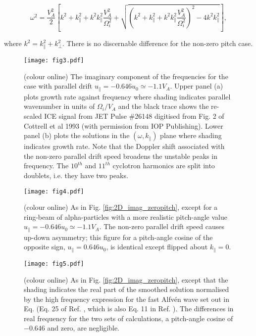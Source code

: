\documentclass[12pt]{iopart}
\begin{document}
\begin{equation}
  \omega^2 = \frac{V_A^2}{2}\left[
    k^2 + k_\parallel^2 + k^2k_\parallel^2 \frac{V_A^2}{\Omega_i^2}
  + \sqrt{
    \left(k^2 + k_\parallel^2 + k^2k_\parallel^2 \frac{V_A^2}{\Omega_i^2}\right)^2
    - 4k^2 k_\parallel^2
}
  \right],
\label{eqn:fastalfven}
\end{equation}

\noindent where $k^2 = k_\parallel^2 + k_\perp^2$. There is no discernable
difference for the non-zero pitch case.

\begin{figure}[ht!]
    \raggedleft
\texttt{[image: fig3.pdf]}
    \caption{(colour online) The imaginary component of the frequencies for the
    case with parallel drift $u_{\parallel} = -0.646 u_0 \simeq -1.1 V_A$.
    Upper panel (a) plots growth rate against frequency where shading indicates
    parallel wavenumber in units of $\Omega_i/V_A$ and the black trace shows
    the re-scaled ICE signal from JET Pulse \#26148 digitised from Fig. 2 of
    Cottrell et al 1993 (with permission from IOP Publishing). Lower panel (b)
    plots the solutions
    in the $(\omega,k_\parallel)$ plane where shading indicates growth rate. Note
    that the Doppler shift associated with the non-zero parallel drift speed
    broadens the unstable peaks in frequency. The $10^{th}$ and $11^{th}$ cyclotron
    harmonics are split into doublets, i.e. they have two peaks.}
    \label{fig:2D_F12_physicalpitch}
\end{figure}

\begin{figure}[ht!]
    \raggedleft
\texttt{[image: fig4.pdf]}
    \caption{(colour online) As in Fig. \ref{fig:2D_imag_zeropitch}, except for
    a ring-beam of alpha-particles with a more realistic pitch-angle value
    $u_{\parallel} = -0.646 u_0 \simeq -1.1 V_A$. The non-zero parallel drift
    speed causes up-down asymmetry; this figure for a pitch-angle cosine of the
    opposite sign, $u_{\parallel} = 0.646 u_0$, is identical except flipped
    about $k_\parallel=0$.}
    \label{fig:2D_imag_physicalpitch}
\end{figure}


\begin{figure}[ht!]
    \raggedleft
\texttt{[image: fig5.pdf]}
    \caption{(colour online) As in Fig. \ref{fig:2D_imag_zeropitch}, except that
    the shading indicates the real part of the smoothed solution normalised by
    the high frequency expression for the fast Alfv{\'e}n wave set out in
    Eq. \label{eqn:fastalfven} (Eq. 25 of Ref. \cite{Dendy1994},
    which is also Eq. 11 in Ref. \cite{McClements1996}).
    The differences in real frequency for the two sets of
    calculations, a pitch-angle cosine of $-0.646$ and zero, are
    negligible.}
    \label{fig:2D_real_zeropitch}
\end{figure}
\end{document}
